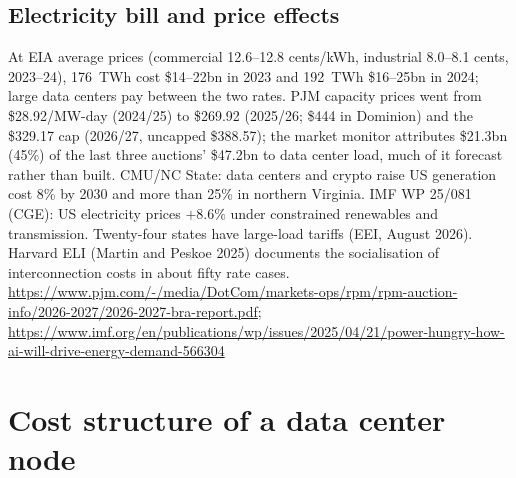 \documentclass[11pt]{article}
\begin{document}
\subsection{Electricity bill and price effects}
At EIA average prices (commercial 12.6--12.8 cents/kWh, industrial 8.0--8.1 cents, 2023--24), 176~TWh cost \$14--22bn in 2023 and 192~TWh \$16--25bn in 2024; large data centers pay between the two rates. PJM capacity prices went from \$28.92/MW-day (2024/25) to \$269.92 (2025/26; \$444 in Dominion) and the \$329.17 cap (2026/27, uncapped \$388.57); the market monitor attributes \$21.3bn (45\%) of the last three auctions' \$47.2bn to data center load, much of it forecast rather than built. CMU/NC State: data centers and crypto raise US generation cost 8\% by 2030 and more than 25\% in northern Virginia. IMF WP 25/081 (CGE): US electricity prices $+8.6\%$ under constrained renewables and transmission. Twenty-four states have large-load tariffs (EEI, August 2026). Harvard ELI (Martin and Peskoe 2025) documents the socialisation of interconnection costs in about fifty rate cases. \url{https://www.pjm.com/-/media/DotCom/markets-ops/rpm/rpm-auction-info/2026-2027/2026-2027-bra-report.pdf}; \url{https://www.imf.org/en/publications/wp/issues/2025/04/21/power-hungry-how-ai-will-drive-energy-demand-566304}

\section{Cost structure of a data center node}\label{sec:cost}
\end{document}
